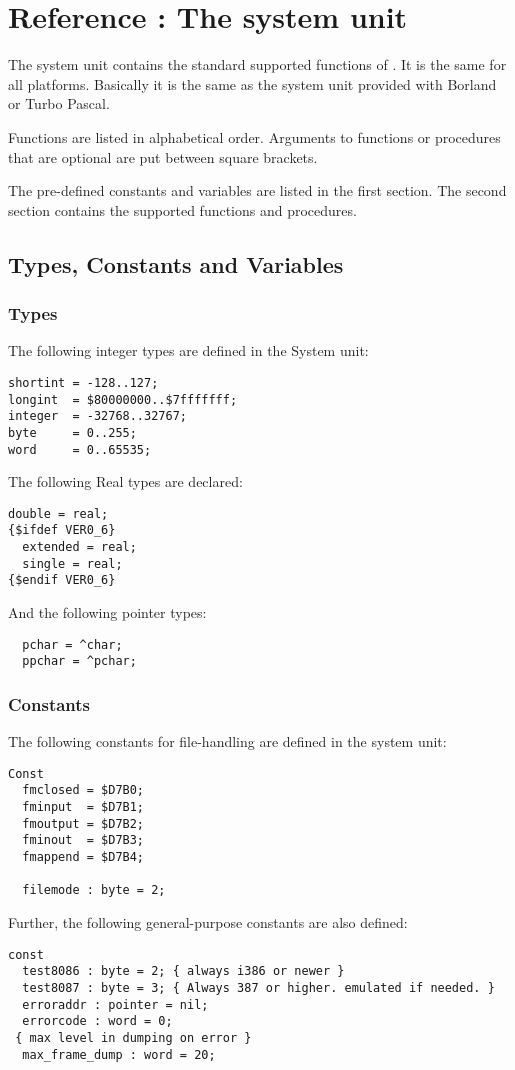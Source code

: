 \documentclass{report}
\begin{document}
%
%

\chapter{Reference : The system unit}
The system unit contains the standard supported functions of \fpk. It is the
same for all platforms. Basically it is the same as the system unit provided
with Borland or Turbo Pascal. 

Functions are listed in alphabetical order.
Arguments to functions or procedures that are optional are put between
square brackets.

The pre-defined constants and variables are listed in the first section. The
second section contains the supported functions and procedures.
\section{Types, Constants and Variables}
\subsection{Types}
The following integer types are defined in the System unit:
\begin{verbatim}
shortint = -128..127;
longint  = $80000000..$7fffffff;
integer  = -32768..32767;
byte     = 0..255;
word     = 0..65535;
\end{verbatim}

The following Real types are declared: 
\begin{verbatim}
double = real;
{$ifdef VER0_6}
  extended = real;
  single = real;
{$endif VER0_6}
\end{verbatim}

And the following pointer types:
\begin{verbatim}
  pchar = ^char;
  ppchar = ^pchar;
\end{verbatim}

\subsection{Constants}
The following constants for file-handling are defined in the system unit:
\begin{verbatim}
Const
  fmclosed = $D7B0;
  fminput  = $D7B1;
  fmoutput = $D7B2;
  fminout  = $D7B3;
  fmappend = $D7B4;

  filemode : byte = 2;
\end{verbatim}
Further, the following general-purpose constants are also defined:
\begin{verbatim} 
const
  test8086 : byte = 2; { always i386 or newer }
  test8087 : byte = 3; { Always 387 or higher. emulated if needed. }
  erroraddr : pointer = nil;
  errorcode : word = 0;
 { max level in dumping on error }
  max_frame_dump : word = 20;
\end{verbatim}
\end{document}
